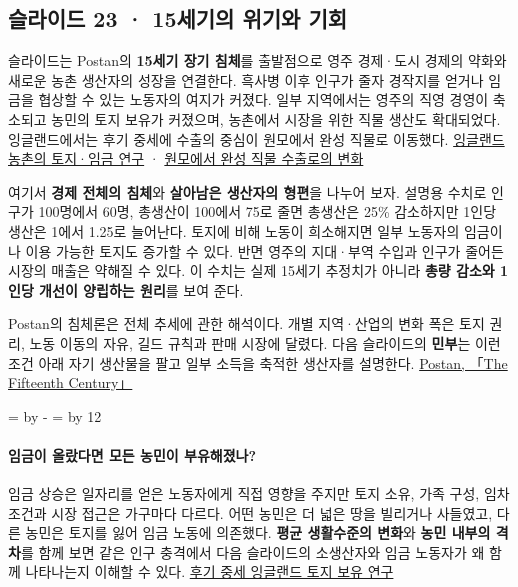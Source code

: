 \documentclass[10pt,a4paper]{article}
\newcommand{\ReserveQuestionSpace}{%
  \par\begingroup
  \dimen0=\pagegoal \advance\dimen0 by -\pagetotal
  \dimen2=\baselineskip \multiply\dimen2 by 12
  \ifdim\dimen0<\dimen2 \newpage\fi
  \endgroup}
\begin{document}
\subsection{슬라이드 23 · 15세기의 위기와 기회}
슬라이드는 Postan의 \textbf{15세기 장기 침체}를 출발점으로 영주 경제·도시 경제의 약화와 새로운 농촌 생산자의 성장을 연결한다. 흑사병 이후 인구가 줄자 경작지를 얻거나 임금을 협상할 수 있는 노동자의 여지가 커졌다. 일부 지역에서는 영주의 직영 경영이 축소되고 농민의 토지 보유가 커졌으며, 농촌에서 시장을 위한 직물 생산도 확대되었다. 잉글랜드에서는 후기 중세에 수출의 중심이 원모에서 완성 직물로 이동했다. \href{https://www.cambridge.org/core/journals/continuity-and-change/article/partnership-among-peasants-rural-england-12701520/F8DB6A2A76E46C44687718E4FDEA8CC8}{잉글랜드 농촌의 토지·임금 연구} · \href{https://academic.oup.com/histres/article/93/260/227/5826632}{원모에서 완성 직물 수출로의 변화}\par

여기서 \textbf{경제 전체의 침체}와 \textbf{살아남은 생산자의 형편}을 나누어 보자. 설명용 수치로 인구가 100명에서 60명, 총생산이 100에서 75로 줄면 총생산은 25\% 감소하지만 1인당 생산은 1에서 1.25로 늘어난다. 토지에 비해 노동이 희소해지면 일부 노동자의 임금이나 이용 가능한 토지도 증가할 수 있다. 반면 영주의 지대·부역 수입과 인구가 줄어든 시장의 매출은 약해질 수 있다. 이 수치는 실제 15세기 추정치가 아니라 \textbf{총량 감소와 1인당 개선이 양립하는 원리}를 보여 준다.\par

Postan의 침체론은 전체 추세에 관한 해석이다. 개별 지역·산업의 변화 폭은 토지 권리, 노동 이동의 자유, 길드 규칙과 판매 시장에 달렸다. 다음 슬라이드의 \textbf{민부}는 이런 조건 아래 자기 생산물을 팔고 일부 소득을 축적한 생산자를 설명한다. \href{https://www.cambridge.org/core/books/abs/essays-on-medieval-agriculture-and-general-problems-of-the-medieval-economy/fifteenth-century/BBC9CF91C3F4F44B029E2DE5B5C7C89C}{Postan, 「The Fifteenth Century」}\par

\ReserveQuestionSpace
\paragraph{임금이 올랐다면 모든 농민이 부유해졌나?}
임금 상승은 일자리를 얻은 노동자에게 직접 영향을 주지만 토지 소유, 가족 구성, 임차 조건과 시장 접근은 가구마다 다르다. 어떤 농민은 더 넓은 땅을 빌리거나 사들였고, 다른 농민은 토지를 잃어 임금 노동에 의존했다. \textbf{평균 생활수준의 변화}와 \textbf{농민 내부의 격차}를 함께 보면 같은 인구 충격에서 다음 슬라이드의 소생산자와 임금 노동자가 왜 함께 나타나는지 이해할 수 있다. \href{https://www.cambridge.org/core/journals/continuity-and-change/article/reappraisal-of-the-freehold-property-market-in-late-medieval-england/AADD1AFA8081A101317AE2BCF9ADDA4E}{후기 중세 잉글랜드 토지 보유 연구}\par
\end{document}
